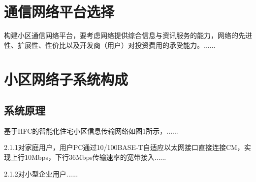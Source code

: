 \chapter{通信网络平台选择}
构建小区通信网络平台，要考虑网络提供综合信息与资讯服务的能力，网络的先进性、扩展性、性价比以及开发商（用户）对投资费用的承受能力。......\par

\chapter{小区网络子系统构成}

\section{系统原理}
基于HFC的智能化住宅小区信息传输网络如图1所示，......\par
2.1.1对家庭用户，用户PC通过10/100BASE-T自适应以太网接口直接连接CM，实现上行10Mbps，下行36Mbps传输速率的宽带接入......\par
2.1.2对小型企业用户......\par
